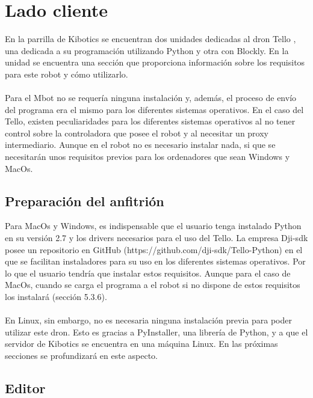 \documentclass{report}
\begin{document}
\section{Lado cliente}

En la parrilla de Kibotics se encuentran dos unidades dedicadas al dron Tello , una dedicada a su programación utilizando Python y otra con Blockly. En la unidad se encuentra una sección que proporciona información sobre los requisitos para este robot y cómo utilizarlo. 
\\
\\
Para el Mbot no se requería ninguna instalación y, además, el proceso de envío del programa era el mismo para los diferentes sistemas operativos. En el caso del Tello, existen peculiaridades para los diferentes sistemas operativos al no tener control sobre la controladora que posee el robot y al necesitar un proxy intermediario. Aunque en el robot no es necesario instalar nada, si que se necesitarán unos requisitos previos para los ordenadores que sean Windows y MacOs.

\subsection{Preparación del anfitrión}

Para MacOs y Windows, es indispensable que el usuario tenga instalado Python en su versión 2.7 y los drivers necesarios para el uso del Tello. La empresa Dji-sdk posee un repositorio en GitHub (https://github.com/dji-sdk/Tello-Python) en el que se facilitan instaladores para su uso en los diferentes sistemas operativos. Por lo que el usuario tendría que instalar estos requisitos. Aunque para el caso de MacOs, cuando se carga el programa a el robot si no dispone de estos requisitos los instalará (sección 5.3.6).
\\
\\
En Linux, sin embargo, no es necesaria ninguna instalación previa para poder utilizar este dron. Esto es gracias a PyInstaller, una librería de Python, y a que el servidor de Kibotics se encuentra en una máquina Linux. En las próximas secciones se profundizará en este aspecto.

\subsection{Editor}
\end{document}
